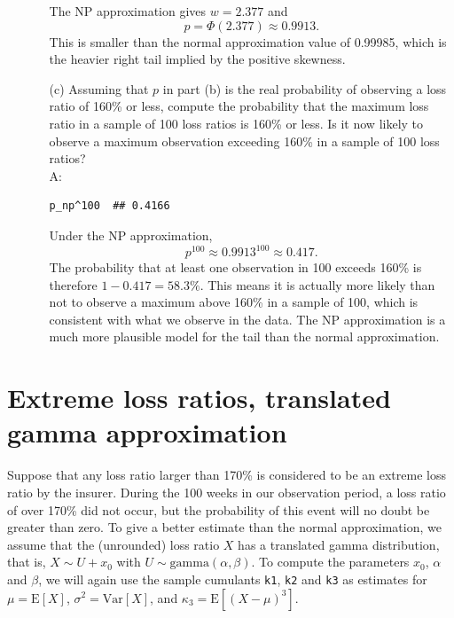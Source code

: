\documentclass{article}
\begin{document}
\begin{enumerate}
\begin{enumerate}
      The NP approximation gives $w = 2.377$ and
      \[
        p = \Phi(2.377) \approx 0.9913.
      \]
      This is smaller than the normal approximation value of 0.99985, which is the heavier right tail implied by the positive skewness.
\newpage
      \item[(c)] Assuming that $p$ in part (b) is the real probability of observing a loss ratio of 160\% or less, compute the probability that the maximum loss ratio in a sample of 100 loss ratios is 160\% or less. Is it now likely to observe a maximum observation exceeding 160\% in a sample of 100 loss ratios? \\ A:

\begin{lstlisting}
p_np^100  ## 0.4166
\end{lstlisting}

      Under the NP approximation,
      \[
        p^{100} \approx 0.9913^{100} \approx 0.417.
      \]
      The probability that at least one observation in 100 exceeds 160\% is therefore $1 - 0.417 = 58.3\%$. This means it is actually more likely than not to observe a maximum above 160\% in a sample of 100, which is consistent with what we observe in the data. The NP approximation is a much more plausible model for the tail than the normal approximation.
    \end{enumerate}
\end{enumerate}

\newpage
\section{Extreme loss ratios, translated gamma approximation}

Suppose that any loss ratio larger than 170\% is considered to be an extreme loss ratio by the insurer. During the 100 weeks in our observation period, a loss ratio of over 170\% did not occur, but the probability of this event will no doubt be greater than zero. To give a better estimate than the normal approximation, we assume that the (unrounded) loss ratio $X$ has a translated gamma distribution, that is, $X \sim U + x_0$ with $U \sim \mathrm{gamma}(\alpha, \beta)$. To compute the parameters $x_0$, $\alpha$ and $\beta$, we will again use the sample cumulants \texttt{k1}, \texttt{k2} and \texttt{k3} as estimates for $\mu = \mathrm{E}[X]$, $\sigma^2 = \mathrm{Var}[X]$, and $\kappa_3 = \mathrm{E}[(X-\mu)^3]$.
\end{document}
